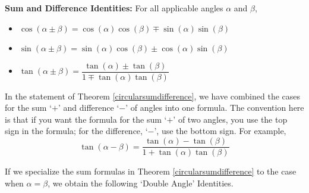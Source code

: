 \colorbox{ResultColor}{\bbm

\begin{thm} \label{circularsumdifference}  \textbf{Sum and Difference Identities:} For all applicable angles $\alpha$ and $\beta$,      

\begin{itemize}

\item  $\cos(\alpha \pm \beta) = \cos(\alpha) \cos(\beta) \mp \sin(\alpha) \sin(\beta)$

\item  $\sin(\alpha \pm \beta) = \sin(\alpha) \cos(\beta) \pm \cos(\alpha) \sin(\beta)$

\item $\tan(\alpha \pm \beta) = \dfrac{\tan(\alpha) \pm \tan(\beta)}{1 \mp \tan(\alpha) \tan(\beta)}$

\end{itemize}

\end{thm}

\ebm}

\smallskip

In the statement of Theorem \ref{circularsumdifference}, we have combined the cases for the sum `$+$' and difference `$-$' of angles into one formula.  The convention here is that if you want the formula for the sum `$+$' of two angles, you use the top sign in the formula;  for the difference, `$-$', use the bottom sign.  For example, \[\tan(\alpha - \beta) = \dfrac{\tan(\alpha) - \tan(\beta)}{1 + \tan(\alpha) \tan(\beta)}\]

If we specialize the sum formulas in Theorem \ref{circularsumdifference} to the case when $\alpha = \beta$, we obtain the following `Double Angle' Identities.

\smallskip

